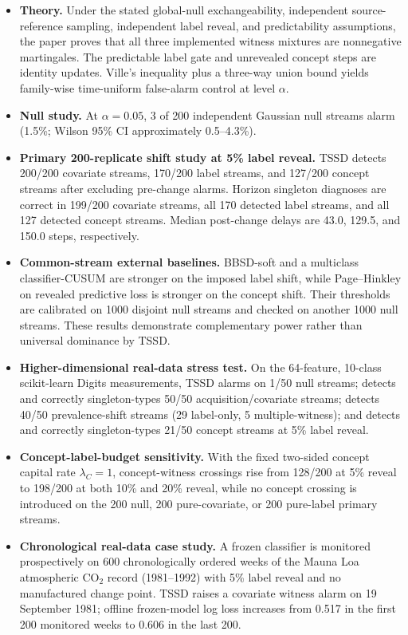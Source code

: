 \documentclass[11pt,a4paper]{article}
\begin{document}
\begin{itemize}
\item \textbf{Theory.} Under the stated global-null exchangeability, independent source-reference sampling, independent label reveal, and predictability assumptions, the paper proves that all three implemented witness mixtures are nonnegative martingales. The predictable label gate and unrevealed concept steps are identity updates. Ville's inequality plus a three-way union bound yields family-wise time-uniform false-alarm control at level $\alpha$.
\item \textbf{Null study.} At $\alpha=0.05$, 3 of 200 independent Gaussian null streams alarm (1.5\%; Wilson 95\% CI approximately 0.5--4.3\%).
\item \textbf{Primary 200-replicate shift study at 5\% label reveal.} TSSD detects 200/200 covariate streams, 170/200 label streams, and 127/200 concept streams after excluding pre-change alarms. Horizon singleton diagnoses are correct in 199/200 covariate streams, all 170 detected label streams, and all 127 detected concept streams. Median post-change delays are 43.0, 129.5, and 150.0 steps, respectively.
\item \textbf{Common-stream external baselines.} BBSD-soft and a multiclass classifier-CUSUM are stronger on the imposed label shift, while Page--Hinkley on revealed predictive loss is stronger on the concept shift. Their thresholds are calibrated on 1000 disjoint null streams and checked on another 1000 null streams. These results demonstrate complementary power rather than universal dominance by TSSD.
\item \textbf{Higher-dimensional real-data stress test.} On the 64-feature, 10-class scikit-learn Digits measurements, TSSD alarms on 1/50 null streams; detects and correctly singleton-types 50/50 acquisition/covariate streams; detects 40/50 prevalence-shift streams (29 label-only, 5 multiple-witness); and detects and correctly singleton-types 21/50 concept streams at 5\% label reveal.
\item \textbf{Concept-label-budget sensitivity.} With the fixed two-sided concept capital rate $\lambda_C=1$, concept-witness crossings rise from 128/200 at 5\% reveal to 198/200 at both 10\% and 20\% reveal, while no concept crossing is introduced on the 200 null, 200 pure-covariate, or 200 pure-label primary streams.
\item \textbf{Chronological real-data case study.} A frozen classifier is monitored prospectively on 600 chronologically ordered weeks of the Mauna Loa atmospheric CO$_2$ record (1981--1992) with 5\% label reveal and no manufactured change point. TSSD raises a covariate witness alarm on 19 September 1981; offline frozen-model log loss increases from 0.517 in the first 200 monitored weeks to 0.606 in the last 200.

\end{itemize}
\end{document}
